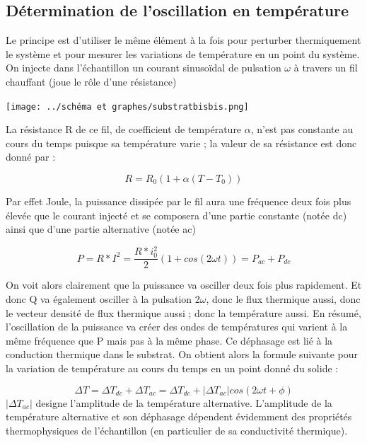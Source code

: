 \documentclass[10pt,a4paper]{report}
\begin{document}
\subsection{Détermination de l'oscillation en température}
Le principe est d’utiliser le même élément à la fois pour perturber thermiquement le système et pour mesurer les variations de température en un point du système. On injecte dans l’échantillon un courant sinusoïdal de pulsation $\omega$ à travers un fil chauffant (joue le rôle d’une résistance)
\begin{center}
\texttt{[image: ../schéma et graphes/substratbisbis.png]}
\label{fig1}
\end{center}
La résistance R de ce fil, de coefficient de température $\alpha$, n’est pas constante au cours du temps puisque sa température varie ; la valeur de sa résistance est donc donné par :
\begin{center}
\begin{equation}
R=R_{0}(1+\alpha(T-T_{0}))
\end{equation}
\end{center}
Par effet Joule, la puissance dissipée par le fil aura une fréquence deux fois plus élevée que le courant injecté et se composera d’une partie constante (notée dc) ainsi que d’une partie alternative (notée ac)
\begin{center}
\begin{equation}
P=R*I^2=\frac{R*i_{0}^2}{2}(1+cos(2\omega t))=P_{ac}+P_{dc}
\end{equation}
\end{center}
On voit alors clairement que la puissance va osciller deux fois plus rapidement. Et donc Q va également osciller à la pulsation 2$\omega$, donc le flux thermique aussi, donc le vecteur densité de flux thermique aussi ; donc la température aussi. En résumé, l’oscillation de la puissance va créer des ondes de températures qui varient à la même fréquence que P mais pas à la même phase. Ce déphasage est lié à la conduction thermique dans le substrat. On obtient alors la formule suivante pour la variation de température au cours du temps en un point donné du solide :
\begin{center}
\begin{equation}
\Delta T=\Delta T_{dc}+\Delta T_{ac}=\Delta T_{dc}+\lvert \Delta T_{ac} \rvert cos(2\omega t+\phi)
\end{equation}
$\lvert \Delta T_{ac} \rvert$ designe l’amplitude de la température alternative.
L’amplitude de la température alternative et son déphasage dépendent évidemment des propriétés thermophysiques de l’échantillon (en particulier de sa conductivité thermique).
\end{center}
\end{document}
